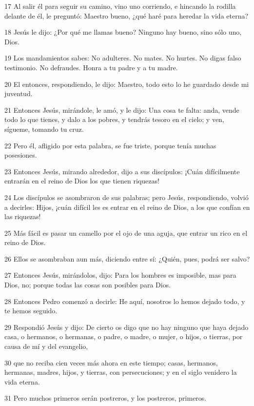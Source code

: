 \par 17 Al salir él para seguir su camino, vino uno corriendo, e hincando la rodilla delante de él, le preguntó: Maestro bueno, ¿qué haré para heredar la vida eterna?
\par 18 Jesús le dijo: ¿Por qué me llamas bueno? Ninguno hay bueno, sino sólo uno, Dios.
\par 19 Los mandamientos sabes: No adulteres. No mates. No hurtes. No digas falso testimonio. No defraudes. Honra a tu padre y a tu madre.
\par 20 El entonces, respondiendo, le dijo: Maestro, todo esto lo he guardado desde mi juventud.
\par 21 Entonces Jesús, mirándole, le amó, y le dijo: Una cosa te falta: anda, vende todo lo que tienes, y dalo a los pobres, y tendrás tesoro en el cielo; y ven, sígueme, tomando tu cruz.
\par 22 Pero él, afligido por esta palabra, se fue triste, porque tenía muchas posesiones.
\par 23 Entonces Jesús, mirando alrededor, dijo a sus discípulos: ¡Cuán difícilmente entrarán en el reino de Dios los que tienen riquezas!
\par 24 Los discípulos se asombraron de sus palabras; pero Jesús, respondiendo, volvió a decirles: Hijos, ¡cuán difícil les es entrar en el reino de Dios, a los que confían en las riquezas!
\par 25 Más fácil es pasar un camello por el ojo de una aguja, que entrar un rico en el reino de Dios.
\par 26 Ellos se asombraban aun más, diciendo entre sí: ¿Quién, pues, podrá ser salvo?
\par 27 Entonces Jesús, mirándolos, dijo: Para los hombres es imposible, mas para Dios, no; porque todas las cosas son posibles para Dios.
\par 28 Entonces Pedro comenzó a decirle: He aquí, nosotros lo hemos dejado todo, y te hemos seguido.
\par 29 Respondió Jesús y dijo: De cierto os digo que no hay ninguno que haya dejado casa, o hermanos, o hermanas, o padre, o madre, o mujer, o hijos, o tierras, por causa de mí y del evangelio,
\par 30 que no reciba cien veces más ahora en este tiempo; casas, hermanos, hermanas, madres, hijos, y tierras, con persecuciones; y en el siglo venidero la vida eterna.
\par 31 Pero muchos primeros serán postreros, y los postreros, primeros.

